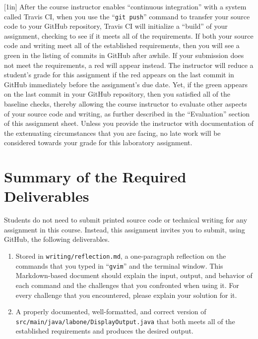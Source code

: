 \documentclass[11pt]{article}
\newcommand{\mainprogramsource}{\lstinline{src/main/java/labone/DisplayOutput.java}}
\newcommand{\reflection}{\lstinline{writing/reflection.md}}
\newcommand{\gitpush}{\command{git push}}
\newcommand{\command}[1]{``\lstinline{#1}''}
\newcommand{\step}[1]{``{#1}''}
\newcommand{\checkmark}{\ding{51}}
\newcommand{\naughtmark}{\ding{55}}
\newcommand{\caution}[1]{\null\hfill\LARGE{\faWarning{}}\newline\scriptsize{\em{#1}}}
\begin{document}
\marginnote{\caution{Verify all checks}}[1in] After the course instructor
enables \step{continuous integration} with a system called Travis CI, when you
use the \gitpush{} command to transfer your source code to your GitHub
repository, Travis CI will initialize a \step{build} of your assignment,
checking to see if it meets all of the requirements. If both your source code
and writing meet all of the established requirements, then you will see a green
\checkmark{} in the listing of commits in GitHub after awhile. If your
submission does not meet the requirements, a red \naughtmark{} will appear
instead. The instructor will reduce a student's grade for this assignment if
the red \naughtmark{} appears on the last commit in GitHub immediately before
the assignment's due date. Yet, if the green \checkmark{} appears on the last
commit in your GitHub repository, then you satisfied all of the baseline checks,
thereby allowing the course instructor to evaluate other aspects of your source
code and writing, as further described in the \step{Evaluation} section of this
assignment sheet. Unless you provide the instructor with documentation of the
extenuating circumstances that you are facing, no late work will be considered
towards your grade for this laboratory assignment.

\section*{Summary of the Required Deliverables}

\noindent Students do not need to submit printed source code or technical
writing for any assignment in this course. Instead, this assignment invites you
to submit, using GitHub, the following deliverables.

\begin{enumerate}

\setlength{\itemsep}{0in}

\item Stored in \reflection{}, a one-paragraph reflection on the commands that
  you typed in \command{gvim} and the terminal window. This Markdown-based
  document should explain the input, output, and behavior of each command and
  the challenges that you confronted when using it. For every challenge that
  you encountered, please explain your solution for it.

\item A properly documented, well-formatted, and correct version of
  \mainprogramsource{} that both meets all of the established requirements and
  produces the desired output.

\end{enumerate}
\end{document}
